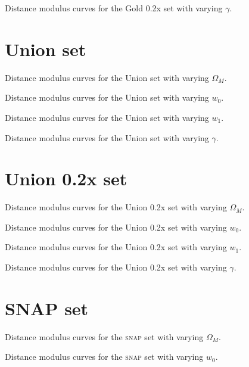   {Distance modulus curves for the Gold 0.2x set with varying $\gamma$.}

\section{Union set}
\label{sec:union-set}

  {Distance modulus curves for the Union set with varying $\Omega_M$.}

  {Distance modulus curves for the Union set with varying $w_0$.}

  {Distance modulus curves for the Union set with varying $w_1$.}

  {Distance modulus curves for the Union set with varying $\gamma$.}

\section{Union 0.2x set}
\label{sec:union-02x-set}

  {Distance modulus curves for the Union 0.2x set with varying $\Omega_M$.}

  {Distance modulus curves for the Union 0.2x set with varying $w_0$.}

  {Distance modulus curves for the Union 0.2x set with varying $w_1$.}

  {Distance modulus curves for the Union 0.2x set with varying $\gamma$.}

\section{SNAP set}
\label{sec:snap-set}

  {Distance modulus curves for the \textsc{snap} set with varying $\Omega_M$.}

  {Distance modulus curves for the \textsc{snap} set with varying $w_0$.}

